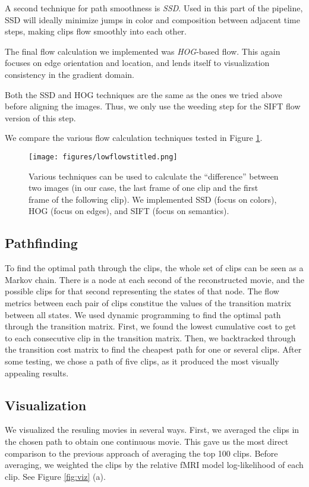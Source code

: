 A second technique for path smoothness is \emph{SSD}.  Used in this part of the pipeline, SSD will ideally minimize jumps in color and composition between adjacent time steps, making clips flow smoothly into each other.

The final flow calculation we implemented was \emph{HOG}-based flow.  This again focuses on edge orientation and location, and lends itself to visualization consistency in the gradient domain.

Both the SSD and HOG techniques are the same as the ones we tried above before aligning the images. Thus, we only use the weeding step for the SIFT flow version of this step.

We compare the various flow calculation techniques tested in Figure \ref{fig:flows}.

\begin{figure}
\centering
    \texttt{[image: figures/lowflowstitled.png]}
\caption{Various techniques can be used to calculate the ``difference'' between two images (in our case, the last frame of one clip and the first frame of the following clip).  We implemented SSD (focus on colors), HOG (focus on edges), and SIFT (focus on semantics).}
\label{fig:flows}
\end{figure}


\subsection{Pathfinding}
To find the optimal path through the clips, the whole set of clips can be seen as a Markov chain. There is a node at each second of the reconstructed movie, and the possible clips for that second representing the states of that node. The flow metrics between each pair of clips constitue the values of the transition matrix between all states. We used dynamic programming to find the optimal path through the transition matrix. First, we found the lowest cumulative cost to get to each consecutive clip in the transition matrix. Then, we backtracked through the transition cost matrix to find the cheapest path for one or several clips. After some testing, we chose a path of five clips, as it produced the most visually appealing results.

\subsection{Visualization}
We visualized the resuling movies in several ways. First, we averaged the clips in the chosen path to obtain one continuous movie. This gave us the most direct comparison to the previous approach of averaging the top 100 clips. Before averaging, we weighted the clips by the relative fMRI model log-likelihood of each clip. See Figure \ref{fig:viz} (a).

